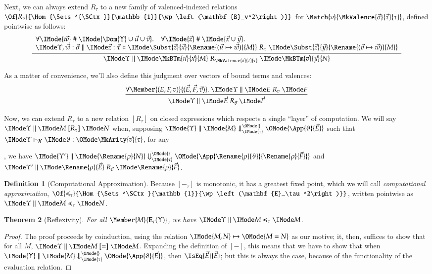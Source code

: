 \documentclass[11pt]{article}
\newtheorem{thm}{Theorem}[section]
\theoremstyle{definition}
\newtheorem{definition}[thm]{Definition}
\theoremstyle{notation}
\theoremstyle{remark}
\numberwithin{equation}{section}
\newcommand\Pow[1]{\wp\left(#1\right)}
\newcommand\EvalN[5]{\IMode{#1}\parallel\IMode{#4}\Downarrow^{\OMode{#3}}_{\IMode{#2}}\OMode{#5}}
\newcommand\Eval[4]{\EvalN{#1}{#2}{}{#3}{#4}}
\newcommand\Exprs{\mathbf{E}}
\newcommand\BTms{\mathbf{B}}
\begin{document}
Next, we can always extend $R_\tau$ to a new
family of valenced-indexed relations
$\Of{R_v}{\Hom{\Sets^{\SCtx}}{\mathbb{1}}{\Pow{\BTms_v^2}}}$ for
$\Match{v}{\MkValence{\vec{\sigma}}{\vec{\tau}}{\tau}}$, defined pointwise as
follows:
\[
  \infer{
    \SBinRel{R_{\MkValence{\vec{\sigma}}{\vec{\tau}}{\tau}}}{\Upsilon}{
      \MkBTm{\vec{u}}{\vec{x}}{M}
    }{
      \MkBTm{\vec{v}}{\vec{y}}{N}
    }
  }{
    \begin{array}{l}
      \forall\IMode{\vec{w}}\mathrel{\#}\IMode{\Dom{\Upsilon}\cup\vec{u}\cup\vec{v}}.\quad
      \forall\IMode{\vec{z}}\mathrel{\#}\IMode{\vec{x}\cup\vec{y}}.\\
      \OSBinRel{R_\tau}{\Upsilon,\vec{w}:\vec{\sigma}}{\vec{z}:\vec{\tau}}{
        \Subst{\vec{z}}{\vec{x}}{
          \Rename{(\vec{u}\mapsto\vec{w})}{M}
        }
      }{
        \Subst{\vec{z}}{\vec{y}}{
          \Rename{(\vec{v}\mapsto\vec{w})}{M}
        }
      }
    \end{array}
  }
\]


As a matter of convenience, we'll also define this judgment over vectors of
bound terms and valences:
\[
  \infer{
    \SBinRel{R_{\vec{v}}}{\Upsilon}{\vec{E}}{\vec{F}}
  }{
    \forall\Member{(E,F,v)}{(\vec{E},\vec{F},\vec{v})}.\
    \SBinRel{R_v}{\Upsilon}{E}{F}
  }
\]

Now, we can extend $R_\tau$ to a new relation $[R_\tau]$ on closed expressions
which respects a single ``layer'' of computation. We will say
$\SBinRel{[R_\tau]}{\Upsilon}{M}{N}$ when, supposing
$\Eval{\Upsilon}{\tau}{M}{\App{\vartheta}{\Vec{E}}}$ such that
$\IsCanOperator{\Upsilon}{\vartheta}{\MkArity{\vec{v}}{\tau}}$,
for any
, we have $\Eval{\Upsilon'}{\tau}{\Rename{\rho}{N}}{\App{\Rename{\rho}{\vartheta}}{\Rename{\rho}{\Vec{F}}}}$ and
$\SBinRel{R_{\vec{v}}}{\Upsilon'}{\Rename{\rho}{\vec{E}}}{\Rename{\rho}{\vec{F}}}$.

\begin{definition}[Computational Approximation]
  Because $[-_\tau]$ is monotonic, it has a greatest fixed point, which we will
  call \emph{computational approximation},
  $\Of{\preccurlyeq_\tau}{\Hom{\Sets^\SCtx}{\mathbb{1}}{\Pow{\Exprs_\tau^2}}}$,
  written pointwise as $\SBinRel{\preccurlyeq_\tau}{\Upsilon}{M}{N}$.
\end{definition}

\begin{thm}[Reflexivity]\label{thm:approx-refl}
  For all $\Member{M}{\Exprs_\tau(\Upsilon)}$, we have $\SBinRel{\preccurlyeq_\tau}{\Upsilon}{M}{M}$.
\end{thm}
\begin{proof}
  The proof proceeds by coinduction, using the relation
  $\IMode{M,N}\mapsto\OMode{M = N}$ as our motive; it, then, suffices to show
  that for all $M$, $\SBinRel{[=]}{\Upsilon}{M}{M}$. Expanding the definition
  of $[-]$, this means that we have to show that when
  $\Eval{\Upsilon}{\tau}{M}{\App{\vartheta}{\vec{E}}}$, then
  $\IsEq{\vec{E}}{\vec{E}}$; but this is always the case, because of the
  functionality of the evaluation relation.
\end{proof}
\end{document}
